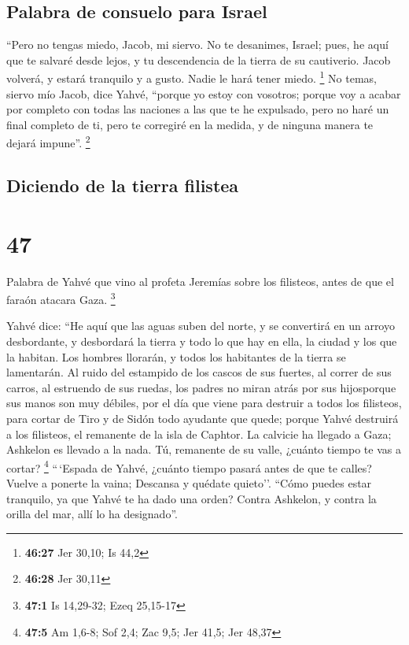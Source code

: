 \hypertarget{palabra-de-consuelo-para-israel}{%
\subsection{Palabra de consuelo para
Israel}\label{palabra-de-consuelo-para-israel}}

 ``Pero no tengas miedo, Jacob, mi siervo. No te
desanimes, Israel; pues, he aquí que te salvaré desde lejos, y tu
descendencia de la tierra de su cautiverio. Jacob volverá, y estará
tranquilo y a gusto. Nadie le hará tener miedo. \footnote{\textbf{46:27}
  Jer 30,10; Is 44,2}  No temas, siervo mío Jacob, dice
Yahvé, ``porque yo estoy con vosotros; porque voy a acabar por completo
con todas las naciones a las que te he expulsado, pero no haré un final
completo de ti, pero te corregiré en la medida, y de ninguna manera te
dejará impune''. \footnote{\textbf{46:28} Jer 30,11}

\hypertarget{diciendo-de-la-tierra-filistea}{%
\subsection{Diciendo de la tierra
filistea}\label{diciendo-de-la-tierra-filistea}}

\hypertarget{section-46}{%
\section{47}\label{section-46}}

 Palabra de Yahvé que vino al profeta Jeremías sobre los
filisteos, antes de que el faraón atacara Gaza. \footnote{\textbf{47:1}
  Is 14,29-32; Ezeq 25,15-17}

 Yahvé dice: ``He aquí que las aguas suben del norte, y se
convertirá en un arroyo desbordante, y desbordará la tierra y todo lo
que hay en ella, la ciudad y los que la habitan. Los hombres llorarán, y
todos los habitantes de la tierra se lamentarán.  Al ruido
del estampido de los cascos de sus fuertes, al correr de sus carros, al
estruendo de sus ruedas, los padres no miran atrás por sus hijosporque
sus manos son muy débiles,  por el día que viene para
destruir a todos los filisteos, para cortar de Tiro y de Sidón todo
ayudante que quede; porque Yahvé destruirá a los filisteos, el remanente
de la isla de Caphtor.  La calvicie ha llegado a Gaza;
Ashkelon es llevado a la nada. Tú, remanente de su valle, ¿cuánto tiempo
te vas a cortar? \footnote{\textbf{47:5} Am 1,6-8; Sof 2,4; Zac 9,5; Jer
  41,5; Jer 48,37}  ``\,`Espada de Yahvé, ¿cuánto tiempo
pasará antes de que te calles? Vuelve a ponerte la vaina; Descansa y
quédate quieto''.  ``Cómo puedes estar tranquilo, ya que
Yahvé te ha dado una orden? Contra Ashkelon, y contra la orilla del mar,
allí lo ha designado''.


